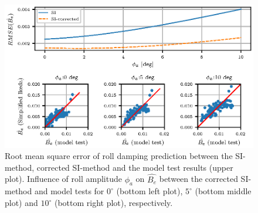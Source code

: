 \begin{figure}[H]
\vspace{-0.5cm}
\centering
  \centering
  \includegraphics[]{figures/ikeda_corrected_phi_a.eps}
  \vspace{-0.5cm}
  \caption{Root mean square error of roll damping prediction between the SI-method, corrected SI-method and the model test results (upper plot). Influence of roll amplitude $\phi_a$ on $\hat{B_e}$ between the corrected SI-method and model tests for $0^{\circ}$ (bottom left plot), $5^{\circ}$ (bottom middle plot) and $10^{\circ}$ (bottom right plot), respectively.}
  \label{fig:ikeda_phi_a_correction}
\end{figure}
